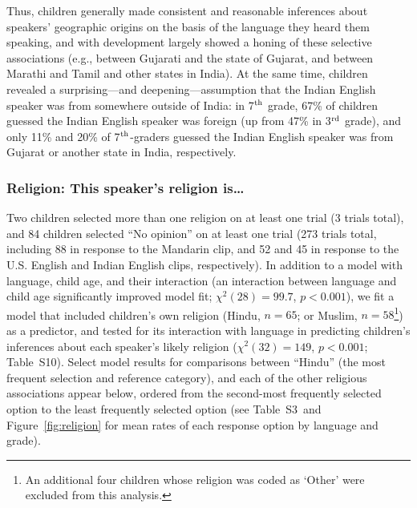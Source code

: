 \documentclass{foushee-adapted-preprint}
\newcommand{\religionmeanstab}{S3}
\newcommand{\religionchirelmodeltab}{S10}
\begin{document}
Thus, children generally made consistent and reasonable inferences about speakers' geographic origins on the basis of the language they heard them speaking, and with development largely showed a honing of these selective associations (e.g., between Gujarati and the state of Gujarat, and between Marathi and Tamil and other states in India). 
At the same time, children revealed a surprising---and deepening---assumption that the Indian English speaker was from somewhere outside of India: in 7$^{\textnormal{th}}$ grade, 67\% of children guessed the Indian English speaker was foreign (up from 47\% in 3$^{\textnormal{rd}}$ grade), and only 11\% and 20\% of 7$^{\textnormal{th}}$-graders guessed the Indian English speaker was from Gujarat or another state in India, respectively.

\subsubsection{Religion: This speaker's religion is\ldots} 
Two children selected more than one religion on at least one trial (3 trials total), and 84 children selected ``No opinion'' on at least one trial (273 trials total, including 88 in response to the Mandarin clip, and 52 and 45 in response to the U.S. English and Indian English clips, respectively). 
In addition to a model with language, child age, and their interaction (an interaction between language and child age significantly improved model fit; $\chi^{2}(28) = 99.7$, $p<0.001$), we fit a model that included children's own religion ({Hindu}, $n=65$; or {Muslim}, $n=58$\footnote{An additional four children whose religion was coded as `Other' were excluded from this analysis.}) as a predictor, and tested for its interaction with language in predicting children's inferences about each speaker's likely religion ($\chi^{2}(32)=149$, $p<0.001$; Table~\religionchirelmodeltab). Select model results for comparisons between ``Hindu'' (the most frequent selection and reference category), and each of the other religious associations appear below, ordered from the second-most frequently selected option to the least frequently selected option (see Table~\religionmeanstab\ and Figure~\ref{fig:religion} for mean rates of each response option by language and grade). 
\end{document}
